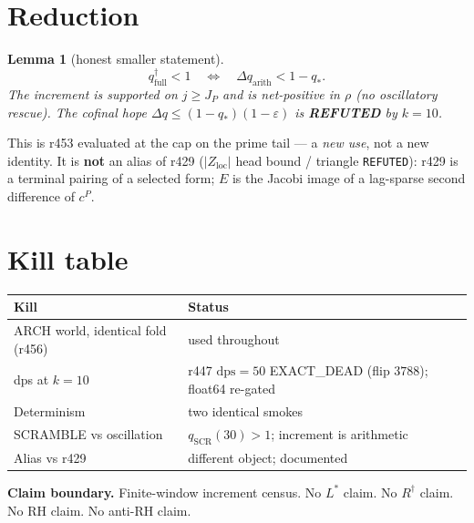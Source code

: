 \documentclass[11pt]{article}
\newtheorem{lemma}{Lemma}
\begin{document}
\section{Reduction}\label{sec:C}

\begin{lemma}[honest smaller statement]\label{lem:C}
\[
q^{\dagger}_{\mathrm{full}}<1
\quad\Longleftrightarrow\quad
\Delta q_{\mathrm{arith}}<1-q_*.
\]
The increment is supported on $j\ge J_P$
and is net-positive in $\rho$ (no
oscillatory rescue).
The cofinal hope
$\Delta q\le(1-q_*)(1-\varepsilon)$
is \textbf{REFUTED} by $k=10$.
\end{lemma}

This is r453 evaluated at the cap on the
prime tail --- a \emph{new use}, not a
new identity.
It is \textbf{not} an alias of r429
($|Z_{\mathrm{loc}}|$ head bound /
triangle \texttt{REFUTED}):
r429 is a terminal pairing of a
selected form; $E$ is the Jacobi image
of a lag-sparse second difference of
$c^P$.

\section{Kill table}\label{sec:kills}

\begin{center}
\begin{tabular}{@{}lp{7.8cm}@{}}
\toprule
Kill & Status \\
\midrule
ARCH world, identical fold (r456)
  & used throughout \\
dps at $k=10$
  & r447 $\mathrm{dps}=50$ EXACT\_DEAD
    (flip $3788$); float64 re-gated \\
Determinism
  & two identical smokes \\
SCRAMBLE vs oscillation
  & $q_{\mathrm{SCR}}(30)>1$;
    increment is arithmetic \\
Alias vs r429
  & different object; documented \\
\bottomrule
\end{tabular}
\end{center}

\medskip\noindent
\textbf{Claim boundary.}\enspace
Finite-window increment census.
No $L^{*}$ claim.
No $R^{\dagger}$ claim.
No RH claim.
No anti-RH claim.
\end{document}
